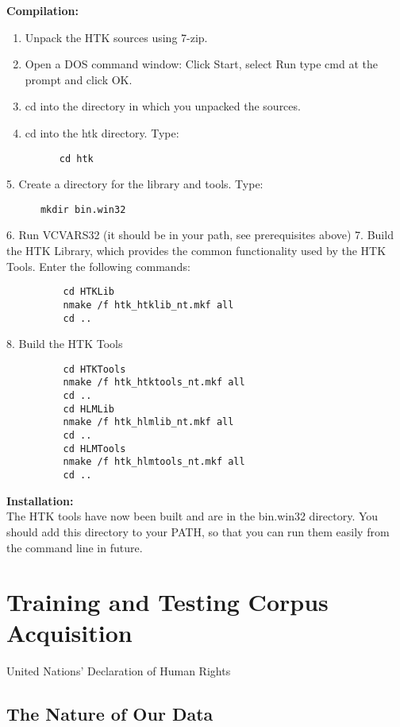\documentclass{wileySev}
\begin{document}
\textbf{Compilation:}
\begin{enumerate}
\item Unpack the HTK sources using 7-zip.
\item Open a DOS command window: Click Start, select Run type cmd at the prompt and click OK.
\item cd into the directory in which you unpacked the sources.
\item cd into the htk directory. Type:
\begin{verbatim}
      cd htk
\end{verbatim}
\end{enumerate}

   5. Create a directory for the library and tools. Type:

\begin{verbatim}
      mkdir bin.win32
\end{verbatim}

   6. Run VCVARS32 (it should be in your path, see prerequisites above)
   7. Build the HTK Library, which provides the common functionality
      used by the HTK Tools. Enter the following commands:

\begin{verbatim}
          cd HTKLib
          nmake /f htk_htklib_nt.mkf all
          cd ..
\end{verbatim}

   8. Build the HTK Tools
\begin{verbatim}
          cd HTKTools
          nmake /f htk_htktools_nt.mkf all
          cd ..
          cd HLMLib
          nmake /f htk_hlmlib_nt.mkf all
          cd ..
          cd HLMTools
          nmake /f htk_hlmtools_nt.mkf all
          cd ..
\end{verbatim}

\textbf{Installation:}\\
The HTK tools have now been built and are in the bin.win32
directory. You should add this directory to your PATH, so that you can
run them easily from the command line in future.

\chapter{Training and Testing Corpus Acquisition}
{United Nations' Declaration of Human Rights \cite{UNDHR}}
\section{The Nature of Our Data}
\end{document}

